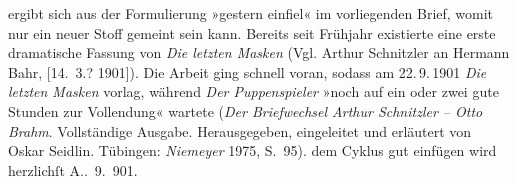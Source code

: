 \begin{ledgroupsized}[t]{13cm}
{{{                  ergibt sich aus der Formulierung »gestern einfiel« im vorliegenden Brief, womit nur ein neuer Stoff gemeint sein kann. Bereits seit 
                  Frühjahr existierte eine erste dramatische Fassung von \emph{Die letzten Masken} (Vgl. Arthur Schnitzler an Hermann Bahr, [14. 3.? 1901]). Die Arbeit ging schnell voran, sodass am
                     22. 9. 1901{ }\emph{Die letzten Masken} vorlag,
                  während \emph{Der Puppenspieler} »noch auf
                     ein oder zwei gute Stunden zur Vollendung« wartete (\emph{Der Briefwechsel Arthur Schnitzler – Otto Brahm}.
                        Vollständige Ausgabe. Herausgegeben, eingeleitet und erläutert von Oskar
                        Seidlin. Tübingen: \emph{Niemeyer}{ }1975, S. 95).}}}\label{K_L01171-2h} dem
               Cyklus gut einfügen wird\pend
           \pstart herzlichſt \spacefill\mbox{A.}\pend{}. 9. 901. \pend
           
         
         \endnumbering{}\end{ledgroupsized}  \newcommand{\dateiname}{L01171}\newcommand{\titel}{Arthur Schnitzler an Hermann Bahr, 10. – 12. 9. 1901}\newcommand{\editorInnen}{ Kurt Ifkovits,  Martin Anton Müller}
      